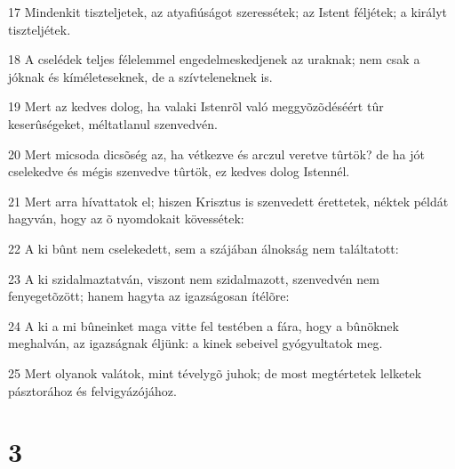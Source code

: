 \par 17 Mindenkit tiszteljetek, az atyafiúságot szeressétek; az Istent féljétek; a királyt tiszteljétek.
\par 18 A cselédek teljes félelemmel engedelmeskedjenek az uraknak; nem csak a jóknak és kíméleteseknek, de a szívteleneknek is.
\par 19 Mert az kedves dolog, ha valaki Istenrõl való meggyõzõdéséért tûr keserûségeket, méltatlanul szenvedvén.
\par 20 Mert micsoda dicsõség az, ha vétkezve és arczul veretve tûrtök? de ha jót cselekedve és mégis szenvedve tûrtök, ez kedves dolog Istennél.
\par 21 Mert arra hívattatok el; hiszen Krisztus is szenvedett érettetek, néktek példát hagyván, hogy az õ nyomdokait kövessétek:
\par 22 A ki bûnt nem cselekedett, sem a szájában álnokság nem találtatott:
\par 23 A ki szidalmaztatván, viszont nem szidalmazott, szenvedvén nem fenyegetõzött; hanem hagyta az igazságosan ítélõre:
\par 24 A ki a mi bûneinket maga vitte fel testében a fára, hogy a bûnöknek meghalván, az igazságnak éljünk: a kinek sebeivel gyógyultatok meg.
\par 25 Mert olyanok valátok, mint tévelygõ juhok; de most megtértetek lelketek pásztorához és felvigyázójához.

\chapter{3}

